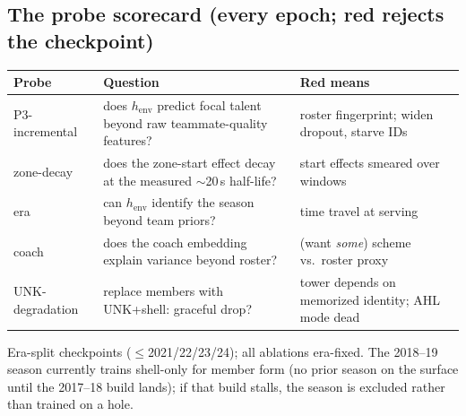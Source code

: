 \documentclass[11pt]{article}
\newcommand{\henv}{\ensuremath{h_{\mathrm{env}}}}
\begin{document}
\subsection{The probe scorecard (every epoch; red rejects the checkpoint)}
\label{sec:probes}
\begin{center}
\begin{tabular}{@{}p{}p{}p{}@{}}
\toprule
\textbf{Probe} & \textbf{Question} & \textbf{Red means} \\
\midrule
P3-incremental & does \henv{} predict focal talent beyond raw teammate-quality
features? & roster fingerprint; widen dropout, starve IDs \\
zone-decay & does the zone-start effect decay at the measured $\sim$20\,s
half-life? & start effects smeared over windows \\
era & can \henv{} identify the season beyond team priors? & time travel at
serving \\
coach & does the coach embedding explain variance beyond roster? &
(want \emph{some}) scheme vs.\ roster proxy \\
UNK-degradation & replace members with UNK+shell: graceful drop? & tower
depends on memorized identity; AHL mode dead \\
\bottomrule
\end{tabular}
\end{center}
Era-split checkpoints ($\le$2021/22/23/24); all ablations era-fixed. The
2018--19 season currently trains shell-only for member form (no prior season on
the surface until the 2017--18 build lands); if that build stalls, the season is
excluded rather than trained on a hole.
\end{document}
